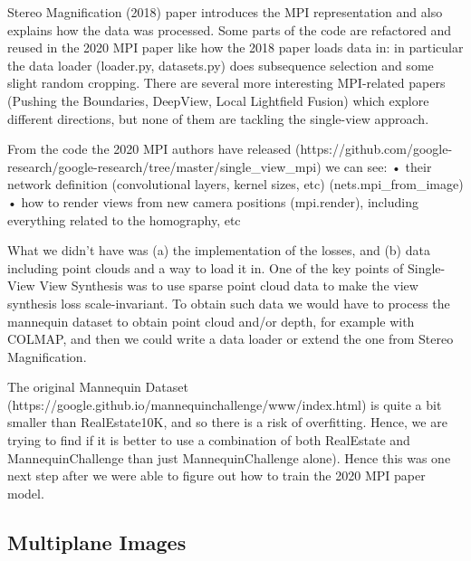 Stereo Magnification (2018) paper introduces the MPI representation and also explains how the data was processed. Some parts of the code are refactored and reused in the 2020 MPI paper like how the 2018 paper loads data in: in particular the data loader (loader.py, datasets.py) does subsequence selection and some slight random cropping. There are several more interesting MPI-related papers (Pushing the Boundaries, DeepView, Local Lightfield Fusion) which explore different directions, but none of them are tackling the single-view approach.

From the code the 2020 MPI authors have released (https://github.com/google-research/google-research/tree/master/single_view_mpi) we can see:
  • their network definition (convolutional layers, kernel sizes, etc) (nets.mpi_from_image)
  • how to render views from new camera positions (mpi.render), including everything related to the homography, etc

What we didn't have was (a) the implementation of the losses, and (b) data including point clouds and a way to load it in.
One of the key points of Single-View View Synthesis was to use sparse point cloud data to make the view synthesis loss scale-invariant. To obtain such data we would have to process the mannequin dataset to obtain point cloud and/or depth, for example with COLMAP, and then we could write a data loader or extend the one from Stereo Magnification.

The original Mannequin Dataset (https://google.github.io/mannequinchallenge/www/index.html) is quite a bit smaller than RealEstate10K, and so there is a risk of overfitting. Hence, we are trying to find if it is better to use a combination of both RealEstate and MannequinChallenge than just MannequinChallenge alone). Hence this was one next step after we were able to figure out how to train the 2020 MPI paper model.

\subsection{Multiplane Images}\label{subsec1:mpi}


